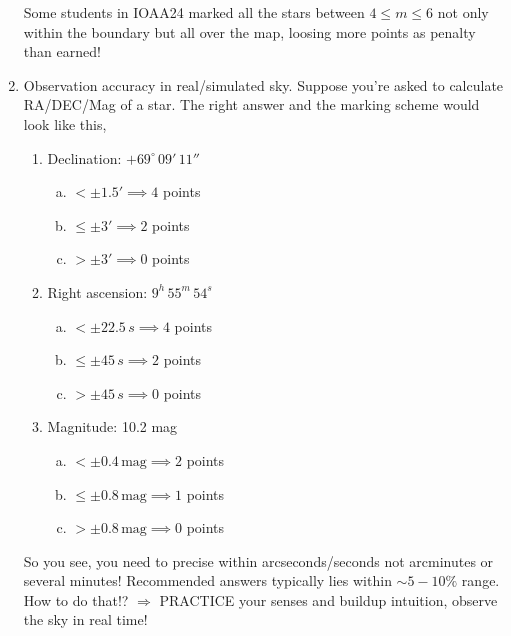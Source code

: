 \documentclass[a4paper,12pt]{extarticle}
\begin{document}
\begin{enumerate}
{\color{red} Some students in IOAA24 marked all the stars between $4 \leq m \leq 6$ not only within the boundary but all over the map, loosing more points as penalty than earned!}	

\item \textsf{Observation accuracy in real/simulated sky.} Suppose you're asked to calculate RA/DEC/Mag of a star. The right answer and the marking scheme would look like this, 

\begin{enumerate}[1.]
	\item Declination: $+69^\circ \, 09' \, 11''$
	\begin{enumerate}[(a)]
		\item $<\pm 1.5' \implies 4$ points
		\item $\leq \pm 3' \implies 2$ points
		\item $>\pm 3' \implies 0$ points
	\end{enumerate}
	\item Right ascension: $9^h \, 55^m\, 54^s$
	\begin{enumerate}[(a)]
		\item $<\pm 22.5\,s \implies 4$ points
		\item $\leq \pm 45\,s \implies 2$ points
		\item $>\pm 45\,s \implies 0$ points
	\end{enumerate}
	\item Magnitude: 10.2 mag
		\begin{enumerate}[(a)]
		\item $<\pm 0.4\, \text{mag} \implies 2$ points
		\item $\leq \pm 0.8\, \text{mag} \implies 1$ points
		\item $>\pm 0.8\, \text{mag} \implies 0$ points
	\end{enumerate}
\end{enumerate}

So you see, you need to precise within arcseconds/seconds not arcminutes or several minutes! Recommended answers typically lies within $\sim 5-10\%$ range. How to do that!? $\Rightarrow$ PRACTICE your senses and buildup intuition, observe the sky in real time! 
	

\end{enumerate}
\end{document}
